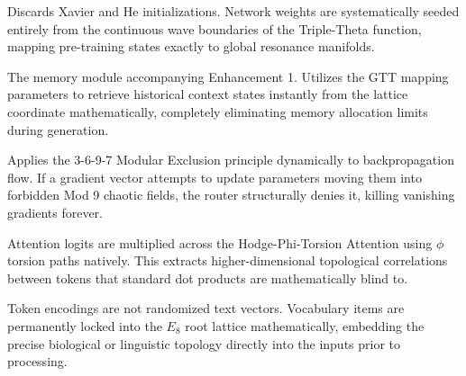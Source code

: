 \begin{tcolorbox}[
	enhanced,
	colback=nrccream!85!white,
	colframe=nrcblue,
	boxrule=0.5mm,
	title=\textbf{4. Triple-Theta Initialisation v3}
	]
	Discards Xavier and He initializations. Network weights are systematically seeded entirely from the continuous wave boundaries of the Triple-Theta function, mapping pre-training states exactly to global resonance manifolds.
\end{tcolorbox}

\begin{tcolorbox}[
	enhanced,
	colback=nrccream!85!white,
	colframe=nrcblue,
	boxrule=0.5mm,
	title=\textbf{5. Resonance Shard KV Cache v3}
	]
	The memory module accompanying Enhancement 1. Utilizes the GTT mapping parameters to retrieve historical context states instantly from the lattice coordinate mathematically, completely eliminating memory allocation limits during generation.
\end{tcolorbox}

\begin{tcolorbox}[
	enhanced,
	colback=nrccream!85!white,
	colframe=nrcblue,
	boxrule=0.5mm,
	title=\textbf{6. Biological Exclusion Gradient Router v3}
	]
	Applies the 3-6-9-7 Modular Exclusion principle dynamically to backpropagation flow. If a gradient vector attempts to update parameters moving them into forbidden Mod 9 chaotic fields, the router structurally denies it, killing vanishing gradients forever.
\end{tcolorbox}

\begin{tcolorbox}[
	enhanced,
	colback=nrccream!85!white,
	colframe=nrcblue,
	boxrule=0.5mm,
	title=\textbf{7. Hodge-$\phi^T$ Torsion Attention v3}
	]
	Attention logits are multiplied across the Hodge-Phi-Torsion Attention using $\phi$ torsion paths natively. This extracts higher-dimensional topological correlations between tokens that standard dot products are mathematically blind to.
\end{tcolorbox}

\begin{tcolorbox}[
	enhanced,
	colback=nrccream!85!white,
	colframe=nrcblue,
	boxrule=0.5mm,
	title=\textbf{8. 163840 $E_8 \times 256$ Golden Basis Embedding}
	]
	Token encodings are not randomized text vectors. Vocabulary items are permanently locked into the $E_8$ root lattice mathematically, embedding the precise biological or linguistic topology directly into the inputs prior to processing.
\end{tcolorbox}


